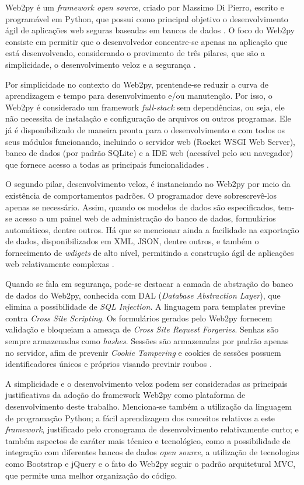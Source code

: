 Web2py é um \emph{framework open source}, criado por Massimo Di Pierro, escrito e programável em Python, que possui como principal objetivo o desenvolvimento ágil de aplicações web seguras baseadas em bancos de dados \cite{Pierro:Livro}. O foco do Web2py consiste em permitir que o desenvolvedor concentre-se apenas na aplicação que está desenvolvendo, considerando o provimento de três pilares, que são a simplicidade, o desenvolvimento veloz e a segurança \cite{Duarte:Web2py}.

Por simplicidade no contexto do Web2py, prentende-se reduzir a curva de aprendizagem e tempo para desenvolvimento e/ou manutenção. Por isso, o Web2py é considerado um framework \textit{full-stack} sem dependências, ou seja, ele não necessita de instalação e configuração de arquivos ou outros programas. Ele já é disponibilizado de maneira pronta para o desenvolvimento e com todos os seus módulos funcionando, incluindo o servidor web (Rocket WSGI Web Server), banco de dados (por padrão SQLite) e a IDE web (acessível pelo seu navegador) que fornece acesso a todas as principais funcionalidades \cite{Pierro:Livro}.

O segundo pilar, desenvolvimento veloz, é instanciando no Web2py por meio da existência de comportamentos padrões. O programador deve sobrescrevê-los apenas se necessário. Assim, quando os modelos de dados são especificados, tem-se acesso a um painel web de administração do banco de dados, formulários automáticos, dentre outros. Há que se mencionar ainda a facilidade na exportação de dados, disponibilizados em XML, JSON, dentre outros, e também o fornecimento de \emph{wdigets} de alto nível, permitindo a construção ágil de aplicações web relativamente complexas \cite{Gordon:Web2pycookbook}.

Quando se fala em segurança, pode-se destacar a camada de abstração do banco de dados do Web2py, conhecida com DAL (\textit{Database Abstraction Layer}), que elimina a possibilidade de \textit{SQL Injection}. A linguagem para templates previne contra \textit{Cross Site Scripting}. Os formulários gerados pelo Web2py fornecem validação e bloqueiam a ameaça de \textit{Cross Site Request Forgeries}. Senhas são sempre armazenadas como \textit{hashes}.  Sessões são armazenadas por padrão apenas no servidor, afim de prevenir \textit{Cookie Tampering} e cookies de sessões possuem  identificadores únicos e próprios visando previnir roubos \cite{Pierro:Livro}.

A simplicidade e o desenvolvimento veloz podem ser consideradas as principais justificativas da adoção do framework Web2py como plataforma de desenvolvimento deste trabalho. Menciona-se também a utilização da linguagem de programação Python; a fácil aprendizagem dos conceitos relativos a este \emph{framework}, justificado pelo cronograma de desenvolvimento relativamente curto; e também aspectos de caráter mais técnico e tecnológico, como a possibilidade de integração com diferentes bancos de dados \emph{open source}, a utilização de tecnologias como Bootstrap e jQuery e o fato do Web2py seguir o padrão arquitetural MVC, que permite uma melhor organização do código.

